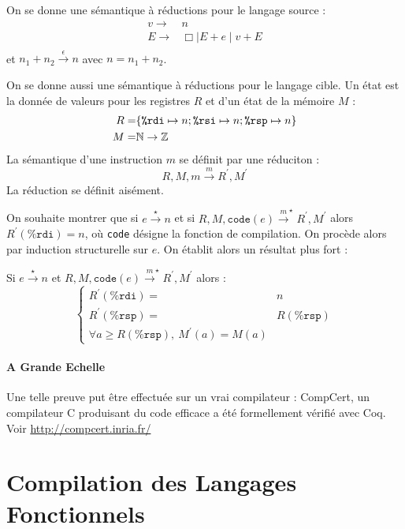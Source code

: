 \documentclass{cours}
\begin{document}
On se donne une sémantique à réductions pour le langage source :
\[
    \begin{aligned}
        v \rightarrow & n                          \\
        E \rightarrow & \Box \mid E + e \mid v + E \\
    \end{aligned}
\]
et $n_{1} + n_{2} \xrightarrow{\epsilon} n$ avec $n = n_{1} +n_{2}$.

On se donne aussi une sémantique à réductions pour le langage cible. Un état est la donnée de valeurs pour les registres $R$ et d'un état de la mémoire $M$ :
\[
    \begin{aligned}
        R = & \{\texttt{\%rdi}\mapsto n; \texttt{\%rsi} \mapsto n; \texttt{\%rsp} \mapsto n\} \\
        M = & \mathbb{N} \rightarrow \mathbb{Z}
    \end{aligned}
\]
La sémantique d'une instruction $m$ se définit par une réduciton :
\[
    R, M, m \xrightarrow{m} R^{'}, M^{'}
\]
La réduction se définit aisément.

On souhaite montrer que si $e\xrightarrow{\star} n$ et si $R, M, \texttt{code}(e) \xrightarrow{m}^{\star} R^{'}, M^{'}$ alors $R^{'}(\texttt{\%rdi}) = n$, où \texttt{code} désigne la fonction de compilation. On procède alors par induction structurelle sur $e$.
On établit alors un résultat plus fort :
\begin{proposition}
    Si $e\xrightarrow{\star} n$ et $R, M, \texttt{code}(e)\xrightarrow{m}^{\star} R^{'}, M^{'}$ alors :
    \[
        \begin{cases}
            R^{'}(\texttt{\%rdi}) = & n                 \\
            R^{'}(\texttt{\%rsp}) = & R(\texttt{\%rsp}) \\
            \forall a \geq R(\texttt{\%rsp}),\ M^{'}(a) = M(a)
        \end{cases}
    \]
\end{proposition}

\subsection{A Grande Echelle}
Une telle preuve put être effectuée sur un vrai compilateur : CompCert, un compilateur C produisant du code efficace a été formellement vérifié avec Coq. Voir \url{http://compcert.inria.fr/}



\part{Compilation des Langages Fonctionnels}
\localtableofcontents
\end{document}
